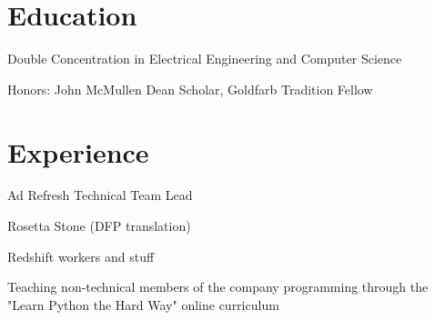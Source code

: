 \documentclass[]{deedy-resume-openfont}
\begin{document}
\lastupdated
{}

\section{Education}
        \begin{tightemize}
        \item
            Double Concentration in Electrical Engineering and Computer Science
        \item
            Honors: John McMullen Dean Scholar, Goldfarb Tradition Fellow
        \end{tightemize}
\sectionsep

\section{Experience}

    \begin{tightemize}
        \item
            Ad Refresh Technical Team Lead
        \item
            Rosetta Stone (DFP translation)
        \item
            Redshift workers and stuff
        \item
            Teaching non-technical members of the company programming through
            the "Learn Python the Hard Way" online curriculum
    \end{tightemize}
\sectionsep
\end{document}
